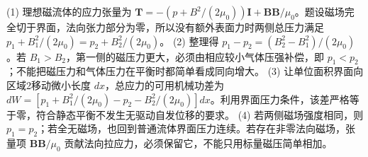 (1) 理想磁流体的应力张量为 \(\mathbf T=-(p+B^2/(2\mu_0))\mathbf I+\mathbf B\mathbf B/\mu_0\)。题设磁场完全切于界面，法向张力部分为零，所以没有额外表面力时两侧总压力满足 \(p_1+B_1^2/(2\mu_0)=p_2+B_2^2/(2\mu_0)\)。
(2) 整理得 \(p_1-p_2=(B_2^2-B_1^2)/(2\mu_0)\)。若 \(B_1>B_2\)，第一侧的磁压力更大，必须由相应较小气体压强补偿，即 \(p_1<p_2\)；不能把磁压力和气体压力在平衡时都简单看成同向增大。
(3) 让单位面积界面向区域2移动微小长度 \(dx\)，总应力的可用机械功差为 \(dW=[p_1+B_1^2/(2\mu_0)-p_2-B_2^2/(2\mu_0)]dx\)。利用界面压力条件，该差严格等于零，符合静态平衡不发生无驱动自发位移的要求。
(4) 若两侧磁场强度相同，则 \(p_1=p_2\)；若全无磁场，也回到普通流体界面压力连续。若存在非零法向磁场，张量项 \(\mathbf B\mathbf B/\mu_0\) 贡献法向拉应力，必须保留它，不能只用标量磁压简单相加。
